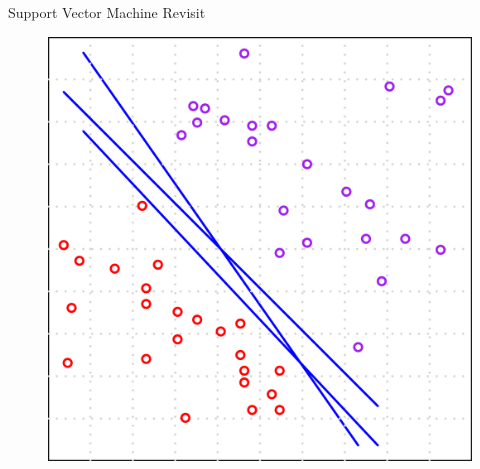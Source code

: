 \documentclass[first=dgreen,second=purple,logo=yellowexc]{aaltoslides}
\begin{document}
\begin{frame}{Support Vector Machine Revisit}
\begin{itemize}
\begin{figure}
        \includegraphics[scale=0.15]{./plots/linear_perceptron.pdf}
    \end{figure}
\end{itemize}
\end{frame}
\end{document}
